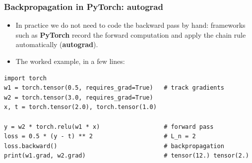 \documentclass[10pt]{beamer}
\begin{document}

\begin{frame}[fragile]
\frametitle{Backpropagation in PyTorch: autograd}

\begin{itemize}
\item In practice we do not need to code the backward pass by hand: frameworks
  such as \textbf{PyTorch} record the forward computation and apply the
  chain rule automatically (\textbf{autograd}).
\item The worked example, in a few lines:
\end{itemize}

\begin{lstlisting}
import torch
w1 = torch.tensor(0.5, requires_grad=True)   # track gradients
w2 = torch.tensor(3.0, requires_grad=True)
x, t = torch.tensor(2.0), torch.tensor(1.0)

y = w2 * torch.relu(w1 * x)                  # forward pass
loss = 0.5 * (y - t) ** 2                    # L_n = 2
loss.backward()                              # backpropagation
print(w1.grad, w2.grad)                      # tensor(12.) tensor(2.)
\end{lstlisting}


\end{frame}
\end{document}
